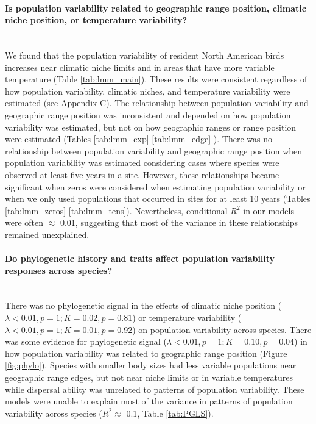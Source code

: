 \paragraph*{Is population variability related to geographic range position, climatic niche position, or temperature variability?}\mbox{}\\ 
We found that the population variability of resident North American birds increases near climatic niche limits and in areas that have more variable temperature (Table \ref{tab:lmm_main}). These results were consistent regardless of how population variability, climatic niches, and temperature variability were estimated (see Appendix C). The relationship between population variability and geographic range position was inconsistent and depended on how population variability was estimated, but not on how geographic ranges or range position were estimated (Tables \ref{tab:lmm_exp}-\ref{tab:lmm_edge} ). There was no relationship between population variability and geographic range position when population variability was estimated considering cases where species were observed at least five years in a site. However, these relationships became significant when zeros were considered when estimating population variability or when we only used populations that occurred in sites for at least 10 years (Tables \ref{tab:lmm_zeros}-\ref{tab:lmm_tens}). Nevertheless, conditional $R^2$ in our models were often $\approx$ 0.01, suggesting that most of the variance in these relationships remained unexplained. 

\paragraph*{Do phylogenetic history and traits affect population variability responses across species?}\mbox{}\\ 
There was no phylogenetic signal in the effects of climatic niche position ($\lambda  < 0.01, p = 1; K = 0.02, p = 0.81$) or temperature variability ($\lambda < 0.01, p = 1; K = 0.01, p = 0.92$) on population variability across species. There was some evidence for phylogenetic signal ($\lambda  < 0.01, p = 1; K = 0.10, p = 0.04$) in how population variability was related to geographic range position (Figure \ref{fig:phylo}). Species with smaller body sizes had less variable populations near geographic range edges, but not near niche limits or in variable temperatures while dispersal ability was unrelated to patterns of population variability. These models were unable to explain most of the variance in patterns of population variability across species ($R^2 \approx$ 0.1, Table \ref{tab:PGLS}). 
